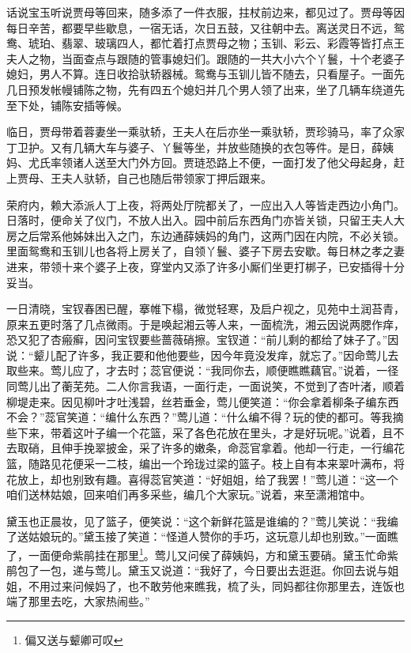 \documentclass[12pt,oneside]{book}
\begin{document}
话说宝玉听说贾母等回来，随多添了一件衣服，拄杖前边来，都见过了。贾母等因每日辛苦，都要早些歇息，一宿无话，次日五鼓，又往朝中去。离送灵日不远，鸳鸯、琥珀、翡翠、玻璃四人，都忙着打点贾母之物；玉钏、彩云、彩霞等皆打点王夫人之物，当面查点与跟随的管事媳妇们。跟随的一共大小六个丫鬟，十个老婆子媳妇，男人不算。连日收拾驮轿器械。鸳鸯与玉钏儿皆不随去，只看屋子。一面先几日预发帐幔铺陈之物，先有四五个媳妇并几个男人领了出来，坐了几辆车绕道先至下处，铺陈安插等候。

临日，贾母带着蓉妻坐一乘驮轿，王夫人在后亦坐一乘驮轿，贾珍骑马，率了众家丁卫护。又有几辆大车与婆子、丫鬟等坐，并放些随换的衣包等件。是日，薛姨妈、尤氏率领诸人送至大门外方回。贾琏恐路上不便，一面打发了他父母起身，赶上贾母、王夫人驮轿，自己也随后带领家丁押后跟来。

荣府内，赖大添派人丁上夜，将两处厅院都关了，一应出入人等皆走西边小角门。日落时，便命关了仪门，不放人出入。园中前后东西角门亦皆关锁，只留王夫人大房之后常系他姊妹出入之门，东边通薛姨妈的角门，这两门因在内院，不必关锁。里面鸳鸯和玉钏儿也各将上房关了，自领丫鬟、婆子下房去安歇。每日林之孝之妻进来，带领十来个婆子上夜，穿堂内又添了许多小厮们坐更打梆子，已安插得十分妥当。

一日清晓，宝钗春困已醒，搴帷下榻，微觉轻寒，及启户视之，见苑中土润苔青，原来五更时落了几点微雨。于是唤起湘云等人来，一面梳洗，湘云因说两腮作痒，恐又犯了杏瘢癣，因问宝钗要些蔷薇硝擦。宝钗道：“前儿剩的都给了妹子了。”因说：“颦儿配了许多，我正要和他他要些，因今年竟没发痒，就忘了。”因命莺儿去取些来。莺儿应了，才去时；蕊官便说：“我同你去，顺便瞧瞧藕官。”说着，一径同莺儿出了蘅芜苑。二人你言我语，一面行走，一面说笑，不觉到了杏叶渚，顺着柳堤走来。因见柳叶才吐浅碧，丝若垂金，莺儿便笑道：“你会拿着柳条子编东西不会？”蕊官笑道：“编什么东西？”莺儿道：“什么编不得？玩的使的都可。等我摘些下来，带着这叶子编一个花篮，采了各色花放在里头，才是好玩呢。”说着，且不去取硝，且伸手挽翠披金，采了许多的嫩条，命蕊官拿着。他却一行走，一行编花篮，随路见花便采一二枝，编出一个玲珑过梁的篮子。枝上自有本来翠叶满布，将花放上，却也别致有趣。喜得蕊官笑道：“好姐姐，给了我罢！”莺儿道：“这一个咱们送林姑娘，回来咱们再多采些，编几个大家玩。”说着，来至潇湘馆中。

黛玉也正晨妆，见了篮子，便笑说：“这个新鲜花篮是谁编的？”莺儿笑说：“我编了送姑娘玩的。”黛玉接了笑道：“怪道人赞你的手巧，这玩意儿却也别致。”一面瞧了，一面便命紫鹃挂在那里\footnote{偏又送与颦卿可叹}。莺儿又问侯了薛姨妈，方和黛玉要硝。黛玉忙命紫鹃包了一包，递与莺儿。黛玉又说道：“我好了，今日要出去逛逛。你回去说与姐姐，不用过来问候妈了，也不敢劳他来瞧我，梳了头，同妈都往你那里去，连饭也端了那里去吃，大家热闹些。”
\end{document}
